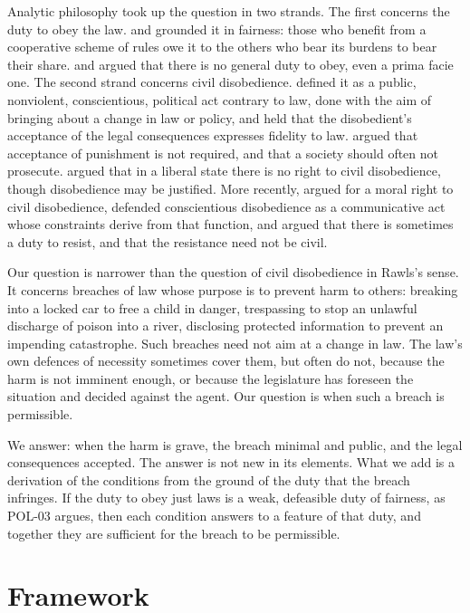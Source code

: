 \documentclass{situationist-preprint}
\begin{document}
Analytic philosophy took up the question in two strands. The first concerns the duty to obey the law. \citet{Hart1955} and \citet{Rawls1964} grounded it in fairness: those who benefit from a cooperative scheme of rules owe it to the others who bear its burdens to bear their share. \citet{Smith1973} and \citet{Simmons1979} argued that there is no general duty to obey, even a prima facie one. The second strand concerns civil disobedience. \citet[§§55--59]{Rawls1971} defined it as a public, nonviolent, conscientious, political act contrary to law, done with the aim of bringing about a change in law or policy, and held that the disobedient's acceptance of the legal consequences expresses fidelity to law. \citet[ch.~8]{Dworkin1977} argued that acceptance of punishment is not required, and that a society should often not prosecute. \citet[ch.~14]{Raz1979} argued that in a liberal state there is no right to civil disobedience, though disobedience may be justified. More recently, \citet{Lefkowitz2007} argued for a moral right to civil disobedience, \citet{Brownlee2012} defended conscientious disobedience as a communicative act whose constraints derive from that function, and \citet{Delmas2018} argued that there is sometimes a duty to resist, and that the resistance need not be civil.

Our question is narrower than the question of civil disobedience in Rawls's sense. It concerns breaches of law whose purpose is to prevent harm to others: breaking into a locked car to free a child in danger, trespassing to stop an unlawful discharge of poison into a river, disclosing protected information to prevent an impending catastrophe. Such breaches need not aim at a change in law. The law's own defences of necessity sometimes cover them, but often do not, because the harm is not imminent enough, or because the legislature has foreseen the situation and decided against the agent. Our question is when such a breach is permissible.

We answer: when the harm is grave, the breach minimal and public, and the legal consequences accepted. The answer is not new in its elements. What we add is a derivation of the conditions from the ground of the duty that the breach infringes. If the duty to obey just laws is a weak, defeasible duty of fairness, as POL-03 argues, then each condition answers to a feature of that duty, and together they are sufficient for the breach to be permissible.

\section{Framework}
\end{document}
